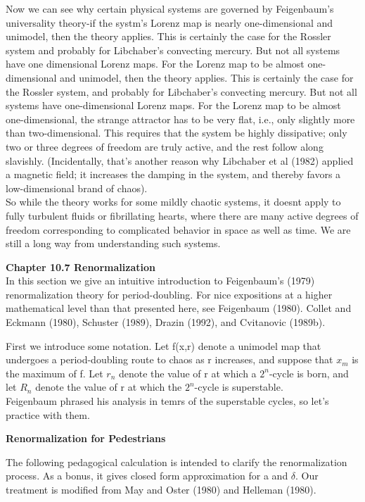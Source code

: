 \documentclass{article}
\newcommand\tab[1][1cm]{\hspace*{#1}}
\begin{document}
Now we can see why certain physical systems are governed by Feigenbaum's universality theory-if the systm's Lorenz map is nearly one-dimensional and unimodel, then the theory applies. This is certainly the case for the Rossler system and probably for Libchaber's convecting mercury. But not all systems have one dimensional Lorenz maps. For the Lorenz map to be almost one-dimensional and unimodel, then the theory applies. This is certainly the case for the Rossler system, and probably for Libchaber's convecting mercury. But not all systems have one-dimensional Lorenz maps. For the Lorenz map to be almost one-dimensional, the strange attractor has to be very flat, i.e., only slightly more than two-dimensional. This requires that the system be highly dissipative; only two or three degrees of freedom are truly active, and the rest follow along slavishly. (Incidentally, that's another reason why Libchaber et al (1982) applied a magnetic field; it increases the damping in the system, and thereby favors a low-dimensional brand of chaos). \\ \tab
So while the theory works for some mildly chaotic systems, it doesnt apply to fully turbulent fluids or fibrillating hearts, where there are many active degrees of freedom corresponding to complicated behavior in space as well as time. We are still a long way from understanding such systems.

\textbf {Chapter 10.7 Renormalization} \\

In this section we give an intuitive introduction to Feigenbaum's (1979) renormalization theory for period-doubling. For nice expositions at a higher mathematical level than that presented here, see Feigenbaum (1980). Collet and Eckmann (1980), Schuster (1989), Drazin (1992), and Cvitanovic (1989b). \\ \tab

First we introduce some notation. Let f(x,r) denote a unimodel map that undergoes a period-doubling route to chaos as r increases, and suppose that $x_{m}$ is the maximum of f. Let $r_{n}$ denote the value of r at which a $2^{n}$-cycle is born, and let $R_{n}$ denote the value of r at which the $2^{n}$-cycle is superstable. \\ \tab
Feigenbaum phrased his analysis in temrs of the superstable cycles, so let's practice with them. 

\textbf {Renormalization for Pedestrians} \\ \tab

The following pedagogical calculation is intended to clarify the renormalization process. As a bonus, it gives closed form approximation for a and $\delta$. Our treatment is modified from May and Oster (1980) and Helleman (1980). \\ \tab
\end{document}
